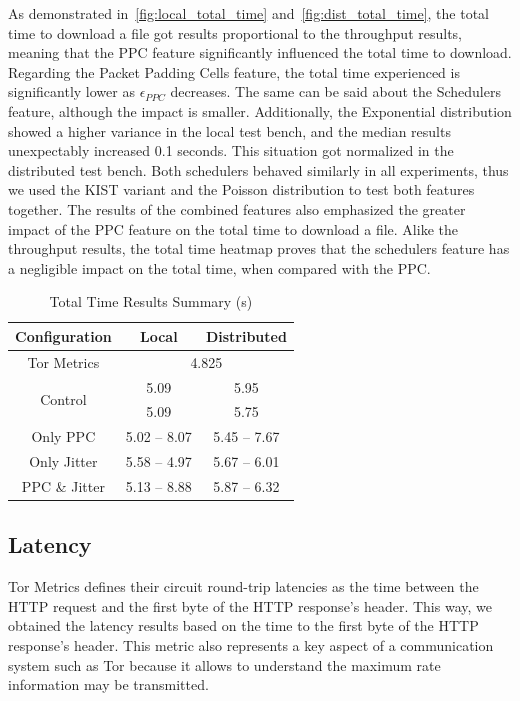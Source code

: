 As demonstrated in~\autoref{fig:local_total_time} and~\autoref{fig:dist_total_time}, the total time to download a file got results proportional to the throughput results, meaning that the PPC feature significantly influenced the total time to download. Regarding the Packet Padding Cells feature, the total time experienced is significantly lower as $\epsilon_{PPC}$ decreases. The same can be said about the Schedulers feature, although the impact is smaller. Additionally, the Exponential distribution showed a higher variance in the local test bench, and the median results unexpectably increased 0.1 seconds. This situation got normalized in the distributed test bench.   
Both schedulers behaved similarly in all experiments, thus we used the KIST variant and the Poisson distribution to test both features together. The results of the combined features also emphasized the greater impact of the PPC feature on the total time to download a file. Alike the throughput results, the total time heatmap proves that the schedulers feature has a negligible impact on the total time, when compared with the PPC.\@
\begin{table}[htbp]
    \centering
    \begin{tabular}{|c|c|c|}
    \hline
    \textbf{Configuration} & \textbf{Local} & \textbf{Distributed} \\
    \hline
    Tor Metrics &  \multicolumn{2}{c|}{4.825} \\ 
    \hline
    \multirow{2}{*}{Control} & 5.09 & 5.95\\ 
    & 5.09 & 5.75\\
    \hline
    Only PPC & 5.02 – 8.07 & 5.45 – 7.67\\
    \hline
    Only Jitter & 5.58 – 4.97 & 5.67 – 6.01\\
    \hline
    PPC \& Jitter & 5.13 – 8.88 & 5.87 – 6.32\\
    \hline
    \end{tabular}
    \caption{Total Time Results Summary (s)}\label{tab:total_time_summary}
\end{table}

\FloatBarrier
\subsection{Latency}

Tor Metrics defines their circuit round-trip latencies as the time between the HTTP request and the first byte of the HTTP response's header. This way, we obtained the latency results based on the time to the first byte of the HTTP response's header. This metric also represents a key aspect of a communication system such as Tor because it allows to understand the maximum rate information may be transmitted. 

